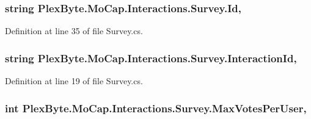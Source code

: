 \subsubsection[{\texorpdfstring{Id}{Id}}]{\setlength{\rightskip}{0pt plus 5cm}string Plex\+Byte.\+Mo\+Cap.\+Interactions.\+Survey.\+Id\hspace{0.3cm}{\ttfamily [get]}, {\ttfamily [set]}}\hypertarget{class_plex_byte_1_1_mo_cap_1_1_interactions_1_1_survey_a7d24bb1bc8db75b6f2b8751cdf7e83f1}{}\label{class_plex_byte_1_1_mo_cap_1_1_interactions_1_1_survey_a7d24bb1bc8db75b6f2b8751cdf7e83f1}


Definition at line 35 of file Survey.\+cs.

\subsubsection[{\texorpdfstring{Interaction\+Id}{InteractionId}}]{\setlength{\rightskip}{0pt plus 5cm}string Plex\+Byte.\+Mo\+Cap.\+Interactions.\+Survey.\+Interaction\+Id\hspace{0.3cm}{\ttfamily [get]}, {\ttfamily [set]}}\hypertarget{class_plex_byte_1_1_mo_cap_1_1_interactions_1_1_survey_a8d9364d1707414404e0056c269c37697}{}\label{class_plex_byte_1_1_mo_cap_1_1_interactions_1_1_survey_a8d9364d1707414404e0056c269c37697}


Definition at line 19 of file Survey.\+cs.

\subsubsection[{\texorpdfstring{Max\+Votes\+Per\+User}{MaxVotesPerUser}}]{\setlength{\rightskip}{0pt plus 5cm}int Plex\+Byte.\+Mo\+Cap.\+Interactions.\+Survey.\+Max\+Votes\+Per\+User\hspace{0.3cm}{\ttfamily [get]}, {\ttfamily [set]}}\hypertarget{class_plex_byte_1_1_mo_cap_1_1_interactions_1_1_survey_ad7edb8b491c86a65a4a604388e730b9c}{}\label{class_plex_byte_1_1_mo_cap_1_1_interactions_1_1_survey_ad7edb8b491c86a65a4a604388e730b9c}


